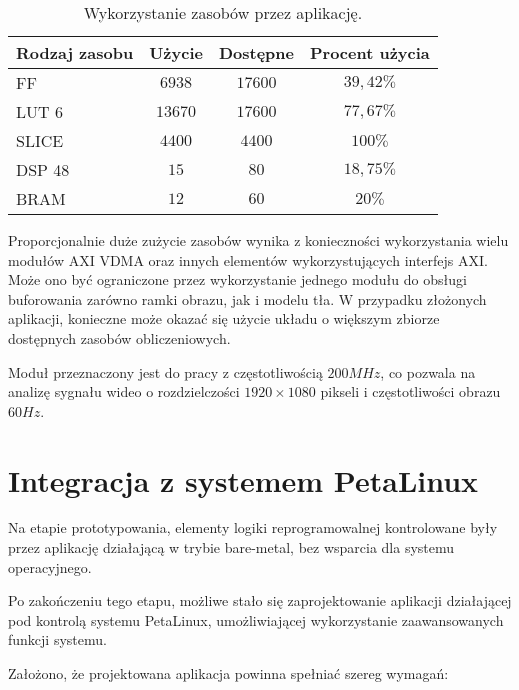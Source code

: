 \begin{table}[h]
	\caption{Wykorzystanie zasobów przez aplikację.}
	\centering
	\label{tab;background-model-utilization}
	\begin{tabular}{|l|c|c|c|}
		\hline
		\textbf{Rodzaj zasobu} & \textbf{Użycie} & \textbf{Dostępne} & \textbf{Procent użycia}      \\ \hline
		FF                     & $6938$            & $17600$             & $39,42\%$                 \\ \hline
		LUT 6                  & $13670$            & $17600$             & $77,67\%$                 \\ \hline
		SLICE                  & $4400$            & $4400$             & $100\%$                 \\ \hline
		DSP 48                 & $15$               & $80$                & $18,75\%$                    \\ \hline
		BRAM                   & $12$               & $60$                & $20\%$                   \\ \hline
	\end{tabular}
\end{table}

Proporcjonalnie duże zużycie zasobów wynika z konieczności wykorzystania wielu modułów AXI VDMA oraz innych elementów wykorzystujących interfejs AXI. Może ono być ograniczone przez wykorzystanie jednego modułu do obsługi buforowania zarówno ramki obrazu, jak i modelu tła. W przypadku złożonych aplikacji, konieczne może okazać się użycie układu o większym zbiorze dostępnych zasobów obliczeniowych.

Moduł przeznaczony jest do pracy z częstotliwością $200MHz$, co pozwala na analizę sygnału wideo o rozdzielczości $1920 \times 1080$ pikseli i częstotliwości obrazu $60Hz$.
\section{Integracja z systemem PetaLinux}
Na etapie prototypowania, elementy logiki reprogramowalnej kontrolowane były przez aplikację działającą w trybie bare-metal, bez wsparcia dla systemu operacyjnego.

Po zakończeniu tego etapu, możliwe stało się zaprojektowanie aplikacji działającej pod kontrolą systemu PetaLinux, umożliwiającej wykorzystanie zaawansowanych funkcji systemu.

Założono, że projektowana aplikacja powinna spełniać szereg wymagań:

